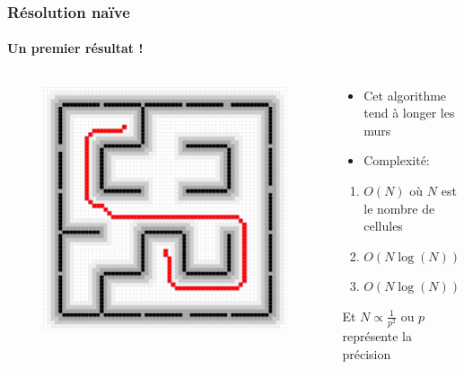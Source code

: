 \begin{frame}
\frametitle{Résolution naïve}
\framesubtitle{Un premier résultat !}
\begin{columns}
    \begin{column}{.55\textwidth}
        \begin{figure}
            \includegraphics[width=1\linewidth]{assets/naif_2.png}
        \end{figure}
    \end{column}
    \begin{column}{.5\textwidth}
        \begin{itemize}
            \item Cet algorithme tend à longer les murs
            \item Complexité:
        \end{itemize}
        \begin{enumerate}
            \item \(O(N)\) où \(N\) est le nombre de cellules
            \item \(O(N\log(N))\)
            \item \(O(N\log(N))\)
        \end{enumerate}
        Et \(N \propto \frac{1}{p^2}\) ou \(p\) représente la précision
    \end{column}
\end{columns}
\end{frame}